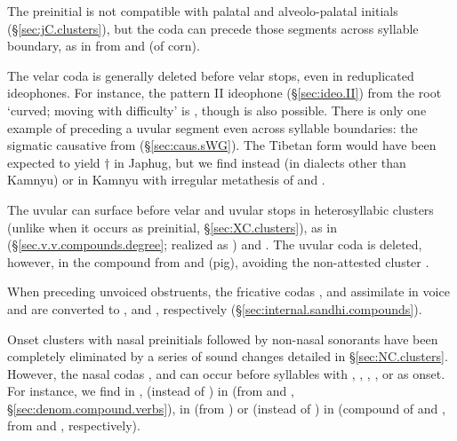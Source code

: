 The preinitial  is not compatible with palatal and alveolo-palatal initials (§\ref{sec:jC.clusters}), but the coda  can precede those segments across syllable boundary, as in  from  and  (of corn).

The velar coda  is generally deleted before velar stops, even in reduplicated ideophones. For instance, the pattern II ideophone (§\ref{sec:ideo.II}) from the root  `curved; moving with difficulty' is , though  is also possible. There is only one example of  preceding a uvular segment even across syllable boundaries: the sigmatic causative  from  (§\ref{sec:caus.sWG}). The Tibetan form   would have been expected to  yield $\dagger$ in Japhug, but we find instead  (in dialects other than Kamnyu) or  in Kamnyu with irregular metathesis of  and .

The uvular  can surface before velar and uvular stops in heterosyllabic clusters (unlike when it occurs as preinitial, §\ref{sec:XC.clusters}), as in  (§\ref{sec.v.v.compounds.degree}; realized as ) and . The uvular coda is deleted, however, in the compound  from  and  (pig), avoiding the non-attested cluster .

When preceding unvoiced obstruents, the fricative codas ,  and  assimilate in voice and are converted to ,  and , respectively (§\ref{sec:internal.sandhi.compounds}).

Onset clusters with nasal preinitials followed by non-nasal sonorants have been completely eliminated by a series of sound changes detailed in §\ref{sec:NC.clusters}. However, the nasal codas ,  and  can occur before syllables with , , , ,  or  as onset. For instance, we find  in ,  (instead of ) in  (from   and , §\ref{sec:denom.compound.verbs}),  in  (from ) or  (instead of ) in  (compound of  and , from  and , respectively).

